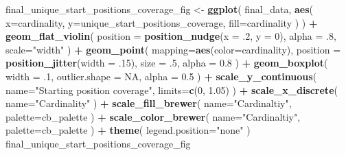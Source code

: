 \documentclass[]{book}
\newenvironment{Shaded}{\begin{snugshade}}{\end{snugshade}}
\newcommand{\DataTypeTok}[1]{\textcolor[rgb]{0.13,0.29,0.53}{#1}}
\newcommand{\DecValTok}[1]{\textcolor[rgb]{0.00,0.00,0.81}{#1}}
\newcommand{\FloatTok}[1]{\textcolor[rgb]{0.00,0.00,0.81}{#1}}
\newcommand{\KeywordTok}[1]{\textcolor[rgb]{0.13,0.29,0.53}{\textbf{#1}}}
\newcommand{\NormalTok}[1]{#1}
\newcommand{\OperatorTok}[1]{\textcolor[rgb]{0.81,0.36,0.00}{\textbf{#1}}}
\newcommand{\OtherTok}[1]{\textcolor[rgb]{0.56,0.35,0.01}{#1}}
\newcommand{\StringTok}[1]{\textcolor[rgb]{0.31,0.60,0.02}{#1}}
\begin{document}
\begin{Shaded}
\begin{Highlighting}[]
\NormalTok{final_unique_start_positions_coverage_fig <-}\StringTok{ }\KeywordTok{ggplot}\NormalTok{(}
\NormalTok{    final_data,}
    \KeywordTok{aes}\NormalTok{(}
      \DataTypeTok{x=}\NormalTok{cardinality,}
      \DataTypeTok{y=}\NormalTok{unique_start_positions_coverage,}
      \DataTypeTok{fill=}\NormalTok{cardinality}
\NormalTok{    )}
\NormalTok{  ) }\OperatorTok{+}
\StringTok{  }\KeywordTok{geom_flat_violin}\NormalTok{(}
    \DataTypeTok{position =} \KeywordTok{position_nudge}\NormalTok{(}\DataTypeTok{x =} \FloatTok{.2}\NormalTok{, }\DataTypeTok{y =} \DecValTok{0}\NormalTok{),}
    \DataTypeTok{alpha =} \FloatTok{.8}\NormalTok{,}
    \DataTypeTok{scale=}\StringTok{"width"}
\NormalTok{  ) }\OperatorTok{+}
\StringTok{  }\KeywordTok{geom_point}\NormalTok{(}
    \DataTypeTok{mapping=}\KeywordTok{aes}\NormalTok{(}\DataTypeTok{color=}\NormalTok{cardinality),}
    \DataTypeTok{position =} \KeywordTok{position_jitter}\NormalTok{(}\DataTypeTok{width =} \FloatTok{.15}\NormalTok{),}
    \DataTypeTok{size =} \FloatTok{.5}\NormalTok{,}
    \DataTypeTok{alpha =} \FloatTok{0.8}
\NormalTok{  ) }\OperatorTok{+}
\StringTok{  }\KeywordTok{geom_boxplot}\NormalTok{(}
    \DataTypeTok{width =} \FloatTok{.1}\NormalTok{,}
    \DataTypeTok{outlier.shape =} \OtherTok{NA}\NormalTok{,}
    \DataTypeTok{alpha =} \FloatTok{0.5}
\NormalTok{  ) }\OperatorTok{+}
\StringTok{  }\KeywordTok{scale_y_continuous}\NormalTok{(}
    \DataTypeTok{name=}\StringTok{"Starting position coverage"}\NormalTok{,}
    \DataTypeTok{limits=}\KeywordTok{c}\NormalTok{(}\DecValTok{0}\NormalTok{, }\FloatTok{1.05}\NormalTok{)}
\NormalTok{  ) }\OperatorTok{+}
\StringTok{  }\KeywordTok{scale_x_discrete}\NormalTok{(}
    \DataTypeTok{name=}\StringTok{"Cardinality"}
\NormalTok{  ) }\OperatorTok{+}
\StringTok{  }\KeywordTok{scale_fill_brewer}\NormalTok{(}
    \DataTypeTok{name=}\StringTok{"Cardinaltiy"}\NormalTok{,}
    \DataTypeTok{palette=}\NormalTok{cb_palette}
\NormalTok{  ) }\OperatorTok{+}
\StringTok{  }\KeywordTok{scale_color_brewer}\NormalTok{(}
    \DataTypeTok{name=}\StringTok{"Cardinaltiy"}\NormalTok{,}
    \DataTypeTok{palette=}\NormalTok{cb_palette}
\NormalTok{  ) }\OperatorTok{+}
\StringTok{  }\KeywordTok{theme}\NormalTok{(}
    \DataTypeTok{legend.position=}\StringTok{"none"}
\NormalTok{  )}
\NormalTok{final_unique_start_positions_coverage_fig}
\end{Highlighting}
\end{Shaded}
\end{document}
